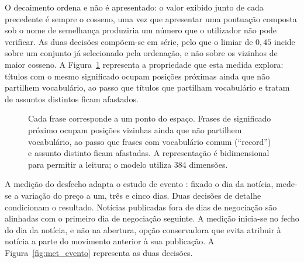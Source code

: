 O decaimento ordena e
não é apresentado: o valor exibido junto de cada precedente é sempre o cosseno, uma vez que
apresentar uma pontuação composta sob o nome de semelhança produziria um número que o utilizador
não pode verificar. As duas decisões compõem-se em série, pelo que o limiar de $0{,}45$ incide sobre
um conjunto já selecionado pela ordenação, e não sobre os vizinhos de maior cosseno. A Figura~\ref{fig:met_embeddings} representa a propriedade que
esta medida explora: títulos com o mesmo significado ocupam posições próximas ainda que não
partilhem vocabulário, ao passo que títulos que partilham vocabulário e tratam de assuntos distintos
ficam afastados.

\begin{figure}[htbp]
\centering
{}
\caption[Frases como pontos num espaço]{Cada frase corresponde a um ponto do espaço. Frases de
significado próximo ocupam posições vizinhas ainda que não partilhem vocabulário, ao passo que
frases com vocabulário comum (``record'') e assunto distinto ficam afastadas. A representação é
bidimensional para permitir a leitura; o modelo utiliza 384 dimensões.}
\label{fig:met_embeddings}
\end{figure}

A medição do desfecho adapta o estudo de evento \autocite{brown1985daily}: fixado o dia da notícia,
mede-se a variação do preço a um, três e cinco dias. Duas decisões de detalhe condicionam o
resultado. Notícias publicadas fora de dias de negociação são alinhadas com o primeiro dia de
negociação seguinte. A medição inicia-se no fecho do dia da notícia, e não na abertura, opção
conservadora que evita atribuir à notícia a parte do movimento anterior à sua publicação.
 A Figura~\ref{fig:met_evento} representa as duas decisões.

